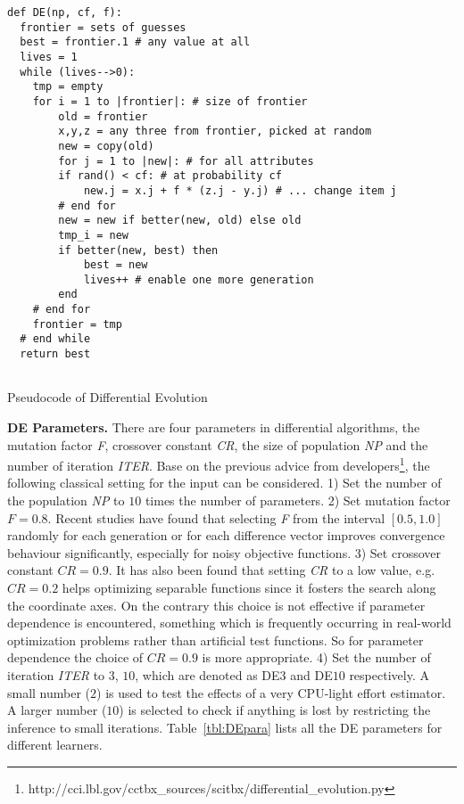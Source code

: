 \begin{algorithm}[t]
\small
\hspace{0.2cm}\begin{lstlisting}[xrightmargin=5.0ex,mathescape,frame=none,numbers=right]
def DE(np, cf, f):
  frontier = sets of guesses
  best = frontier.1 # any value at all
  lives = 1
  while (lives-->0):
    tmp = empty
    for i = 1 to |frontier|: # size of frontier
        old = frontier
        x,y,z = any three from frontier, picked at random
        new = copy(old)
        for j = 1 to |new|: # for all attributes
        if rand() < cf: # at probability cf
            new.j = x.j + f * (z.j - y.j) # ... change item j
        # end for
        new = new if better(new, old) else old
        tmp_i = new
        if better(new, best) then
            best = new
            lives++ # enable one more generation
        end
    # end for
    frontier = tmp
  # end while
  return best
  
\end{lstlisting}
\caption{Pseudocode of Differential Evolution}
\label{algorithm:DE}  
\end{algorithm}

\textbf{DE Parameters.} There are four parameters in differential algorithms, the mutation factor \textit{F}, crossover constant \textit{CR}, the size of population \textit{NP} and the number of iteration \textit{ITER}. Base on the previous advice from developers\footnote{http://cci.lbl.gov/cctbx\_sources/scitbx/differential\_evolution.py}, the following classical setting for the input can be considered. 1) Set the number of the population \textit{NP} to $10$ times the number of parameters. 2) Set mutation factor $\textit{F}=0.8$. Recent studies have found that selecting \textit{F} from the interval $[0.5, 1.0]$ randomly for each generation or for each difference vector improves convergence behaviour significantly, especially for noisy objective functions. 3) Set crossover constant $\textit{CR}=0.9$. It has also been found that setting \textit{CR} to a low value, e.g. $\textit{CR}=0.2$ helps optimizing separable functions since it fosters the search along the coordinate axes. On the contrary this choice is not effective if parameter dependence is encountered, something which is frequently occurring in real-world optimization problems rather than artificial test functions. So for parameter dependence the choice of $\textit{CR}=0.9$ is more appropriate. 4) Set the number of iteration \textit{ITER} to $3$, $10$, which are denoted as DE$3$ and DE$10$ respectively. A small number ($2$) is used to test the effects of a very CPU-light effort estimator. A larger number ($10$) is selected to check if anything is lost by restricting the inference to small iterations. Table~\ref{tbl:DEpara} lists all the DE parameters for different learners. 

